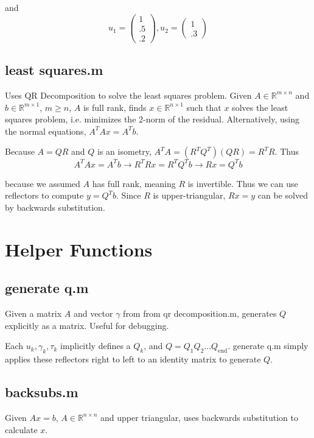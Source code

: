 \documentclass{article}
\newcommand{\R}{\mathbb{R}}
\begin{document}
and
\[
u_1 =
\begin{pmatrix}
1\\
.5\\
.2
\end{pmatrix}
, u_2 =
\begin{pmatrix}
1\\
.3
\end{pmatrix}
\]

\subsection*{least squares.m}

Uses QR Decomposition to solve the least squares problem. Given $A \in \R^{m \times n}$ and $b \in \R^{m \times 1}$, $m \geq n$, $A$ is full rank, finds $x \in \R^{n \times 1}$ such that $x$ solves the least squares problem, i.e. minimizes the 2-norm of the residual. Alternatively, using the normal equations, $A^TAx = A^Tb$.

Because $A = QR$ and $Q$ is an isometry, $A^TA =  (R^TQ^T)(QR) = R^TR$. Thus
\[
A^TAx = A^Tb \rightarrow R^TRx = R^TQ^Tb \rightarrow Rx = Q^Tb
\]

because we assumed $A$ has full rank, meaning $R$ is invertible. Thus we can use reflectors to compute $y = Q^Tb$. Since $R$ is upper-triangular, $Rx = y$ can be solved by backwards substitution.

\section*{Helper Functions}

\subsection*{generate q.m}

Given a matrix $A$ and vector $\gamma$ from from qr decomposition.m, generates $Q$ explicitly as a matrix. Useful for debugging.

Each $u_k, \gamma_k, \tau_k$ implicitly defines a $Q_k$, and $Q = Q_1Q_2 \dots Q_{\text{end}}$. generate q.m simply applies these reflectors right to left to an identity matrix to generate $Q$.

\subsection*{backsubs.m}

Given $Ax = b$, $A \in \R^{n \times n}$ and upper triangular, uses backwards substitution to calculate $x$.
\end{document}
